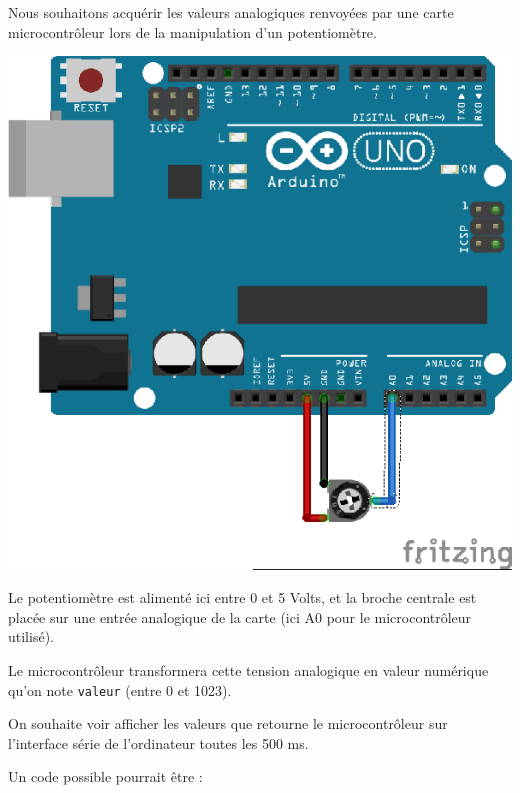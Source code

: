 \documentclass[11pt]{article}
\begin{document}
 Nous souhaitons acquérir les valeurs analogiques renvoyées par une carte microcontrôleur lors de la manipulation d'un potentiomètre. 
 

 
 \begin{center}
  \includegraphics[scale=0.9]{potar.EPS}
 \end{center}
 
 
 Le potentiomètre est alimenté ici entre 0 et 5 Volts, et la broche centrale est placée sur une entrée analogique de la carte (ici A0 pour le microcontrôleur utilisé).
 
 \smallskip
 Le microcontrôleur transformera cette tension analogique en valeur numérique qu'on note \texttt{valeur} (entre 0 et 1023).
 
 \smallskip
 On souhaite voir afficher les valeurs que retourne le microcontrôleur sur l'interface série de l'ordinateur toutes les 500 ms. 
 
 \smallskip
 Un code possible pourrait être : 
 
\end{document}
